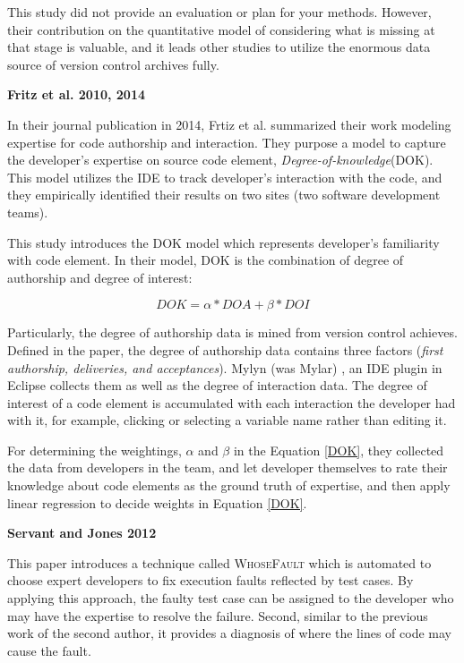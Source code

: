 This study did not provide an evaluation or plan for your methods. However, their contribution on the quantitative model of considering what is missing at that stage is valuable, and it leads other studies to utilize the enormous data source of version control archives fully.

\textbf{Fritz et al. 2010, 2014}

In their journal publication in 2014, Frtiz et al. summarized their work modeling expertise for code authorship and interaction. They purpose a model to capture the developer's expertise on source code element, \textit{Degree-of-knowledge}(DOK). This model utilizes the IDE to track developer's interaction with the code, and they empirically identified their results on two sites (two software development teams).

This study introduces the DOK model which represents developer's familiarity with code element. In their model, DOK is the combination of degree of authorship and degree of interest:

\begin{equation}
DOK = \alpha * DOA + \beta * DOI
\label{DOK}
\end{equation}

Particularly, the degree of authorship data is mined from version control achieves. Defined in the paper,  the degree of authorship data contains three factors (\textit{first authorship, deliveries, and acceptances}). Mylyn (was Mylar) \cite{kersten2005mylar}, an IDE plugin in Eclipse collects them as well as the degree of interaction data. The degree of interest of a code element is accumulated with each interaction the developer had with it, for example, clicking or selecting a variable name rather than editing it.

For determining the weightings, $\alpha$ and $\beta$ in the Equation \ref{DOK}, they collected the data from developers in the team, and let developer themselves to rate their knowledge about code elements as the ground truth of expertise, and then apply linear regression to decide weights in Equation \ref{DOK}.

\textbf{Servant and Jones 2012}

This paper introduces a technique called \textsc{WhoseFault} which is automated to choose expert developers to fix execution faults reflected by test cases. By applying this approach, the faulty test case can be assigned to the developer who may have the expertise to resolve the failure. Second, similar to the previous work of the second author, it provides a diagnosis of where the lines of code may cause the fault.

